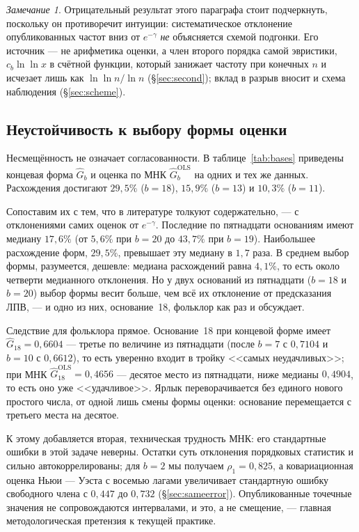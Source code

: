 \documentclass[11pt,a4paper]{article}
\theoremstyle{plain}
\theoremstyle{remark}
\newtheorem{remark}{Замечание}
\newcommand{\emg}{e^{-\gamma}}
\begin{document}
\begin{remark}
Отрицательный результат этого параграфа стоит подчеркнуть, поскольку он противоречит
интуиции: систематическое отклонение опубликованных частот вниз от $\emg$
\emph{не} объясняется схемой подгонки. Его источник --- не арифметика оценки, а
член второго порядка самой эвристики, $c_b\ln\ln x$ в счётной функции, который
занижает частоту при конечных $n$ и исчезает лишь как $\ln\ln n/\ln n$
(\S\ref{sec:second}); вклад в разрыв вносит и схема наблюдения
(\S\ref{sec:scheme}).
\end{remark}

\subsection{Неустойчивость к выбору формы оценки}\label{sec:instability}

Несмещённость не означает согласованности. В таблице~\ref{tab:bases} приведены
концевая форма $\hat G_b$ и оценка по МНК $\hat G_b^{\mathrm{OLS}}$ на одних и тех же
данных. Расхождения достигают $29{,}5\%$ ($b=18$), $15{,}9\%$ ($b=13$) и $10{,}3\%$
($b=11$).

Сопоставим их с тем, что в литературе толкуют содержательно, --- с отклонениями
самих оценок от $\emg$. Последние по пятнадцати основаниям имеют медиану $17{,}6\%$
(от $5{,}6\%$ при $b=20$ до $43{,}7\%$ при $b=19$). Наибольшее расхождение форм,
$29{,}5\%$, превышает эту медиану в $1{,}7$ раза. В среднем выбор формы, разумеется,
дешевле: медиана расхождений равна $4{,}1\%$, то есть около четверти медианного
отклонения. Но у двух оснований из пятнадцати ($b=18$ и $b=20$) выбор формы весит
больше, чем всё их отклонение от предсказания ЛПВ, --- и одно из них, основание~18,
фольклор как раз и обсуждает.

Следствие для фольклора прямое. Основание~18 при концевой форме имеет
$\hat G_{18}=0{,}6604$ --- третье по величине из пятнадцати (после $b=7$ с $0{,}7104$
и $b=10$ с $0{,}6612$), то есть уверенно входит в тройку <<самых неудачливых>>; при МНК
$\hat G_{18}^{\mathrm{OLS}}=0{,}4656$ --- десятое место из пятнадцати, ниже медианы
$0{,}4904$, то есть оно уже <<удачливое>>. Ярлык переворачивается без единого нового
простого числа, от одной лишь смены формы оценки: основание перемещается с третьего
места на десятое.

К этому добавляется вторая, техническая трудность МНК: его стандартные ошибки в этой задаче
неверны. Остатки суть отклонения порядковых статистик и сильно автокоррелированы;
для $b=2$ мы получаем $\rho_1=0{,}825$, а ковариационная оценка Ньюи --- Уэста с восемью
лагами увеличивает стандартную ошибку свободного члена с $0{,}447$ до $0{,}732$
(\S\ref{sec:sameerror}). Опубликованные точечные значения не сопровождаются интервалами,
и это, а не смещение, --- главная методологическая претензия к текущей практике.
\end{document}
